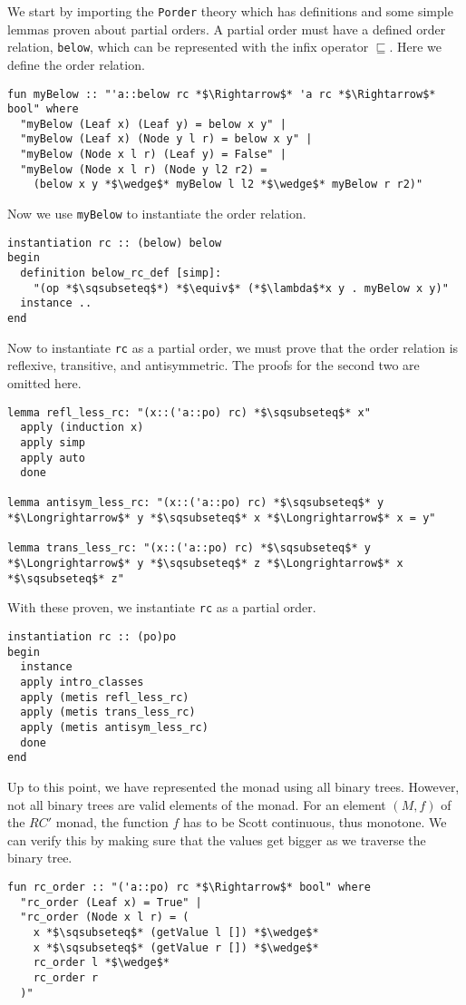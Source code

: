 We start by importing the \texttt{Porder} theory which has definitions and some simple lemmas proven about partial orders.  A partial order must have a defined order relation, \texttt{below}, which can be represented with the infix operator $\sqsubseteq$.  Here we define the order relation.
\begin{lstlisting}[language=Isabelle]
fun myBelow :: "'a::below rc *$\Rightarrow$* 'a rc *$\Rightarrow$* bool" where
  "myBelow (Leaf x) (Leaf y) = below x y" |
  "myBelow (Leaf x) (Node y l r) = below x y" |
  "myBelow (Node x l r) (Leaf y) = False" |
  "myBelow (Node x l r) (Node y l2 r2) = 
    (below x y *$\wedge$* myBelow l l2 *$\wedge$* myBelow r r2)"
\end{lstlisting}
Now we use \texttt{myBelow} to instantiate the order relation.
\begin{lstlisting}[language=Isabelle]
instantiation rc :: (below) below
begin
  definition below_rc_def [simp]:
    "(op *$\sqsubseteq$*) *$\equiv$* (*$\lambda$*x y . myBelow x y)"
  instance ..
end
\end{lstlisting}
Now to instantiate \texttt{rc} as a partial order, we must prove that the order relation is reflexive, transitive, and antisymmetric.  The proofs for the second two are omitted here.
\begin{lstlisting}[language=Isabelle]
lemma refl_less_rc: "(x::('a::po) rc) *$\sqsubseteq$* x"
  apply (induction x)
  apply simp
  apply auto
  done
  
lemma antisym_less_rc: "(x::('a::po) rc) *$\sqsubseteq$* y *$\Longrightarrow$* y *$\sqsubseteq$* x *$\Longrightarrow$* x = y"

lemma trans_less_rc: "(x::('a::po) rc) *$\sqsubseteq$* y *$\Longrightarrow$* y *$\sqsubseteq$* z *$\Longrightarrow$* x *$\sqsubseteq$* z"
\end{lstlisting}
With these proven, we instantiate \texttt{rc} as a partial order.
\begin{lstlisting}[language=Isabelle]
instantiation rc :: (po)po
begin
  instance
  apply intro_classes
  apply (metis refl_less_rc)
  apply (metis trans_less_rc)
  apply (metis antisym_less_rc)
  done
end
\end{lstlisting}
Up to this point, we have represented the monad using all binary trees.  However, not all binary trees are valid elements of the monad.  For an element $(M,f)$ of the $RC'$ monad, the function $f$ has to be Scott continuous, thus monotone.  We can verify this by making sure that the values get bigger as we traverse the binary tree.
\begin{lstlisting}[language=Isabelle]
fun rc_order :: "('a::po) rc *$\Rightarrow$* bool" where
  "rc_order (Leaf x) = True" |
  "rc_order (Node x l r) = (
    x *$\sqsubseteq$* (getValue l []) *$\wedge$* 
    x *$\sqsubseteq$* (getValue r []) *$\wedge$* 
    rc_order l *$\wedge$* 
    rc_order r
  )" 
\end{lstlisting}
